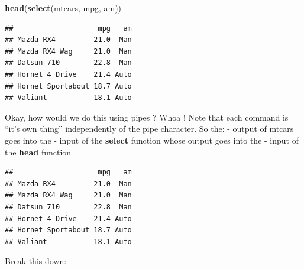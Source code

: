 \documentclass[]{book}
\newenvironment{Shaded}{\begin{snugshade}}{\end{snugshade}}
\newcommand{\KeywordTok}[1]{\textcolor[rgb]{0.13,0.29,0.53}{\textbf{#1}}}
\newcommand{\NormalTok}[1]{#1}
\newcommand{\OperatorTok}[1]{\textcolor[rgb]{0.81,0.36,0.00}{\textbf{#1}}}
\newcommand{\StringTok}[1]{\textcolor[rgb]{0.31,0.60,0.02}{#1}}
\begin{document}
\begin{Shaded}
\begin{Highlighting}[]
\KeywordTok{head}\NormalTok{(}\KeywordTok{select}\NormalTok{(mtcars, mpg, am))}
\end{Highlighting}
\end{Shaded}

\begin{verbatim}
##                    mpg   am
## Mazda RX4         21.0  Man
## Mazda RX4 Wag     21.0  Man
## Datsun 710        22.8  Man
## Hornet 4 Drive    21.4 Auto
## Hornet Sportabout 18.7 Auto
## Valiant           18.1 Auto
\end{verbatim}

Okay, how would we do this using pipes ? Whoa ! Note that each command is ``it's own thing'' independently of the pipe character.
So the:
- output of mtcars goes into the
- input of the \textbf{select} function whose output goes into the
- input of the \textbf{head} function

\begin{Shaded}
\end{Shaded}

\begin{verbatim}
##                    mpg   am
## Mazda RX4         21.0  Man
## Mazda RX4 Wag     21.0  Man
## Datsun 710        22.8  Man
## Hornet 4 Drive    21.4 Auto
## Hornet Sportabout 18.7 Auto
## Valiant           18.1 Auto
\end{verbatim}

Break this down:

\begin{Shaded}
\end{Shaded}
\end{document}
